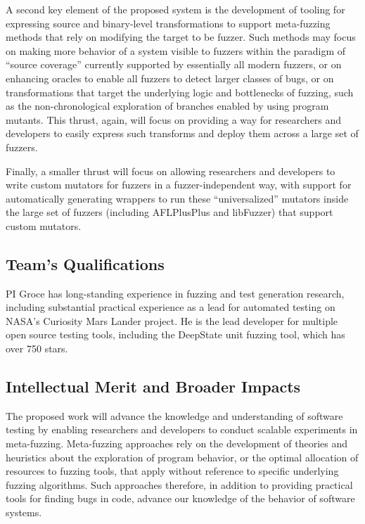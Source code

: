 \documentclass[numbers]{proposalnsf}
\begin{document}
A second key element of the proposed system is the development of tooling for expressing source and binary-level transformations to support meta-fuzzing methods that rely on modifying the target to be fuzzer.  Such methods may focus on making more behavior of a system visible to fuzzers within the paradigm of ``source coverage'' currently supported by essentially all modern fuzzers, or on enhancing oracles to enable all fuzzers to detect larger classes of bugs, or on transformations that target the underlying logic and bottlenecks of fuzzing, such as the non-chronological exploration of branches enabled by using program mutants.  This thrust, again, will focus on providing a way for researchers and developers to easily express such transforms and deploy them across a large set of fuzzers.

Finally, a smaller thrust will focus on allowing researchers and developers to write custom mutators for fuzzers in a fuzzer-independent way, with support for automatically generating wrappers to run these ``universalized'' mutators inside the large set of fuzzers (including AFLPlusPlus and libFuzzer) that support custom mutators.


\subsection{Team's Qualifications}

PI Groce has long-standing experience in fuzzing and test generation research, including substantial practical experience as a lead for automated testing on NASA's Curiosity Mars Lander project.  He is the lead developer for multiple open source testing tools, including the DeepState unit fuzzing tool, which has over 750 stars.  

\subsection{Intellectual Merit and Broader Impacts}

 The proposed work will advance the
knowledge and understanding of software testing by enabling
researchers and developers to conduct scalable experiments in meta-fuzzing.  Meta-fuzzing approaches rely on the development of theories and heuristics about the exploration of program behavior, or the optimal allocation of resources to fuzzing tools, that apply without reference to specific underlying fuzzing algorithms.  Such approaches therefore, in addition to providing practical tools for finding bugs in code, advance our knowledge of the behavior of software systems.
\end{document}
